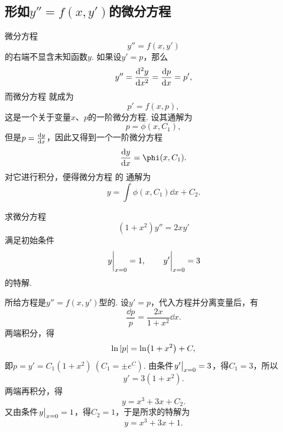 \subsection{\texorpdfstring{形如\(y'' = f(x,y')\)}{由自变量与一阶导数确定二阶导数}的微分方程}
微分方程\begin{equation}\label{equation:微分方程.二阶微分方程.1011型}
	y'' = f(x, y')
\end{equation}的右端不显含未知函数\(y\).
如果设\(y' = p\)，那么\begin{equation*}
	y'' = \dv[2]{y}{x} = \dv{p}{x} = p',
\end{equation*}
而微分方程  就成为\begin{equation*}
	p' = f(x, p),
\end{equation*}
这是一个关于变量\(x\)、\(p\)的一阶微分方程.
设其通解为\begin{equation*}
	p = \phi(x, C_1),
\end{equation*}
但是\(p = \dv{y}{x}\)，因此又得到一个一阶微分方程\begin{equation*}
	\dv{y}{x} = \phi(x, C_1).
\end{equation*}
对它进行积分，便得微分方程  的
通解为\begin{equation}\label{equation:微分方程.二阶微分方程.1011型.通解}
	y = \int \phi(x, C_1) \dd{x} + C_2.
\end{equation}

\begin{example}
求微分方程\begin{equation*}
	(1+x^2) y'' = 2xy'
\end{equation*}满足初始条件\begin{equation*}
	\eval{y}_{x=0} = 1,
	\qquad
	\eval{y'}_{x=0} = 3
\end{equation*}的特解.
\begin{solution}
所给方程是\(y'' = f(x, y')\)型的.
设\(y' = p\)，代入方程并分离变量后，有\begin{equation*}
	\frac{\dd{p}}{p} = \frac{2x}{1+x^2} \dd{x}.
\end{equation*}
两端积分，得\begin{equation*}
	\ln\abs{p} = \ln(1+x^2) + C,
\end{equation*}
即\(p = y' = C_1(1+x^2)\ (C_1 = \pm e^C)\).
由条件\(\eval{y'}_{x=0}=3\)，得\(C_1 = 3\)，所以\begin{equation*}
	y' = 3(1+x^2).
\end{equation*}
两端再积分，得\begin{equation*}
	y = x^3 + 3x + C_2.
\end{equation*}
又由条件\(\eval{y}_{x=0}=1\)，得\(C_2=1\)，于是所求的特解为\begin{equation*}
	y = x^3 + 3x + 1.
\end{equation*}
\end{solution}
\end{example}

